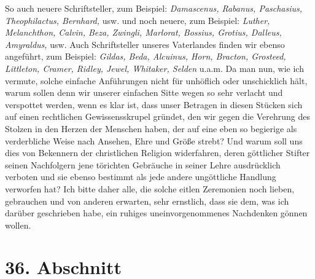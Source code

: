So auch neuere Schriftsteller, zum Beispiel:
\textit{Damascenus,
Rabanus, Paschasius,
Theophilactus,
Bernhard,} usw. und noch neuere, zum Beispiel:
\textit{Luther,
Melanchthon,
Calvin, Beza,
Zwingli, Marlorat,
Bossius, Grotius,
Dalleus, Amyraldus,} usw.
Auch Schriftsteller unseres Vaterlandes finden wir ebenso angeführt, zum Beispiel:
\textit{Gildas, Beda,
Alcuinus, Horn,
Bracton, Grosteed,
Littleton, Cramer,
Ridley,
Jewel, Whitaker,
Selden} u.a.m. Da man nun, wie ich vermute, solche
einfache
Anführungen nicht für unhöflich oder unschicklich hält, warum sollen denn wir
unserer einfachen Sitte wegen so sehr verlacht und verspottet werden, wenn es
klar ist, dass unser Betragen in diesen Stücken sich auf einen rechtlichen
Gewissensskrupel gründet, den wir gegen die Verehrung des Stolzen in den Herzen
der Menschen haben, der auf eine eben so begierige als verderbliche Weise nach
Ansehen, Ehre und Größe strebt? Und warum soll uns dies von Bekennern der
christlichen Religion widerfahren, deren göttlicher Stifter seinen Nachfolgern
jene törichten Gebräuche in seiner Lehre ausdrücklich verboten und sie ebenso
bestimmt als jede andere ungöttliche Handlung verworfen hat? Ich bitte daher
alle, die solche eitlen Zeremonien noch lieben, gebrauchen und von anderen
erwarten, sehr ernstlich, dass sie dem, was ich darüber geschrieben habe, ein
ruhiges uneinvorgenommenes Nachdenken gönnen wollen.

\section{36. Abschnitt} \label{kap9_ab36}

